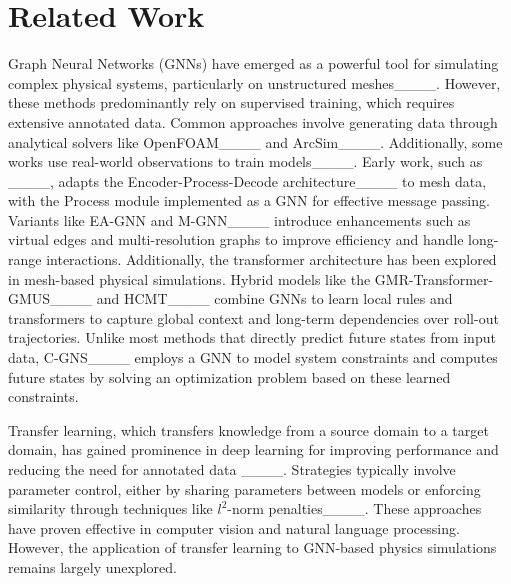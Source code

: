 \section{Related Work}
\label{related_work}

Graph Neural Networks (GNNs) have emerged as a powerful tool for simulating complex physical systems, particularly on unstructured meshes____. 
However, these methods predominantly rely on supervised training, which requires extensive annotated data. Common approaches involve generating data through analytical solvers like OpenFOAM____ and ArcSim____. Additionally, some works use real-world observations to train models____.
Early work, such as \MGN ____, adapts the Encoder-Process-Decode architecture____ to mesh data, with the Process module implemented as a GNN for effective message passing. 
Variants like EA-GNN and M-GNN____ introduce enhancements such as virtual edges and multi-resolution graphs to improve efficiency and handle long-range interactions. 
Additionally, the transformer architecture has been explored in mesh-based physical simulations. Hybrid models like the GMR-Transformer-GMUS____ and HCMT____ combine GNNs to learn local rules and transformers to capture global context and long-term dependencies over roll-out trajectories. 
Unlike most methods that directly predict future states from input data, C-GNS____ employs a GNN to model system constraints and computes future states by solving an optimization problem based on these learned constraints. 

Transfer learning, which transfers knowledge from a source domain to a target domain, has gained prominence in deep learning for improving performance and reducing the need for annotated data ____.
Strategies typically involve parameter control, either by sharing parameters between models or enforcing similarity through techniques like $l^2$-norm penalties____.
These approaches have proven effective in computer vision and natural language processing. However, the application of transfer learning to GNN-based physics simulations remains largely unexplored.